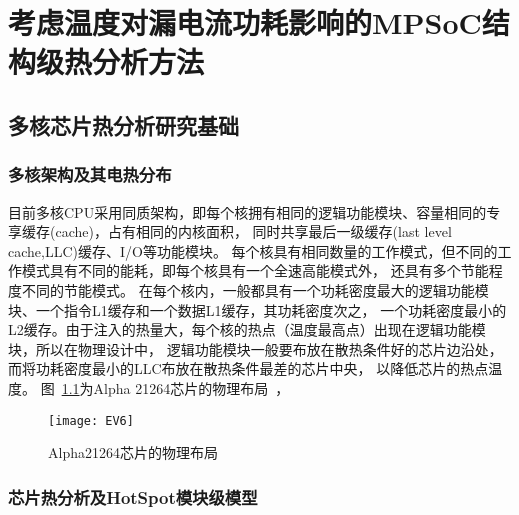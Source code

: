 

\chapter{考虑温度对漏电流功耗影响的MPSoC结构级热分析方法}
\label{cha:SSTA}


\section{多核芯片热分析研究基础}
\label{sec:SSTAbasic}

\subsection{多核架构及其电热分布}

目前多核CPU采用同质架构，即每个核拥有相同的逻辑功能模块、容量相同的专享缓存(cache)，占有相同的内核面积， 同时共享最后一级缓存(last level cache,LLC)缓存、I/O等功能模块。 每个核具有相同数量的工作模式，但不同的工作模式具有不同的能耗，即每个核具有一个全速高能模式外， 还具有多个节能程度不同的节能模式。
在每个核内，一般都具有一个功耗密度最大的逻辑功能模块、一个指令L1缓存和一个数据L1缓存，其功耗密度次之， 一个功耗密度最小的L2缓存。由于注入的热量大，每个核的热点（温度最高点）出现在逻辑功能模块，所以在物理设计中， 逻辑功能模块一般要布放在散热条件好的芯片边沿处，而将功耗密度最小的LLC布放在散热条件最差的芯片中央， 以降低芯片的热点温度。 图~\ref{fig:ev6}为Alpha 21264芯片的物理布局~，

\begin{figure}[H]
  \centering
  \texttt{[image: EV6]}
  \caption{Alpha21264芯片的物理布局}
  \label{fig:ev6}
\end{figure}


\subsection{芯片热分析及HotSpot模块级模型}


